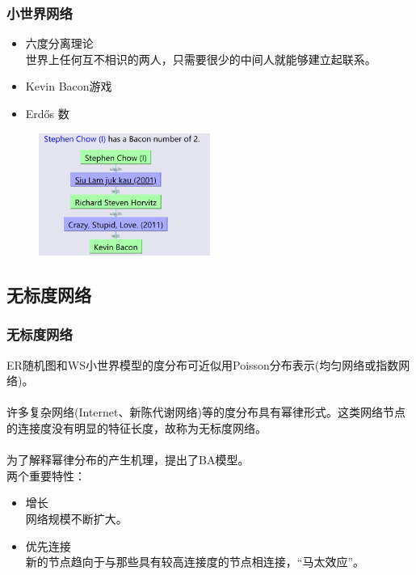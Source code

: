	\begin{frame}
		\frametitle{小世界网络}
		\begin{itemize}
			\item 六度分离理论 \\
			世界上任何互不相识的两人，只需要很少的中间人就能够建立起联系。\\ 
			\item Kevin Bacon游戏 \\ 
			\item Erdős 数 
		\end{itemize}
	
		\begin{figure}[htbp]
			\centering
			\includegraphics[width=0.5\textwidth, bb = 0 0 682 487]{pic/01-kevin.png}
		\end{figure}

	\end{frame}

\subsection*{无标度网络}

	\begin{frame}
		\frametitle{无标度网络}
		ER随机图和WS小世界模型的度分布可近似用Poisson分布表示(均匀网络或指数网络)。\\ ~\\
		许多复杂网络(Internet、新陈代谢网络)等的度分布具有幂律形式。这类网络节点的连接度没有明显的特征长度，故称为无标度网络。\\
		~\\
		为了解释幂律分布的产生机理，提出了BA模型。\\
		两个重要特性：
		\begin{itemize}
			\item 增长 \\
			网络规模不断扩大。\\ 
			\item 优先连接 \\ 
			新的节点趋向于与那些具有较高连接度的节点相连接，“马太效应”。
		\end{itemize}


	\end{frame}

